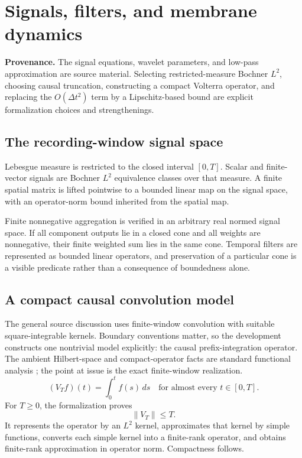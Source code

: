 \documentclass[11pt,a4paper]{article}
\begin{document}
\section{Signals, filters, and membrane dynamics}
\label{sec:signals}

\textbf{Provenance.} The signal equations, wavelet parameters, and low-pass
approximation are source material. Selecting restricted-measure Bochner
\(L^2\), choosing causal truncation, constructing a compact Volterra operator,
and replacing the \(O(\Delta t^2)\) term by a Lipschitz-based bound are explicit
formalization choices and strengthenings.

\subsection{The recording-window signal space}

Lebesgue measure is restricted to the closed interval \([0,T]\). Scalar and
finite-vector signals are Bochner \(L^2\) equivalence classes over that
measure. A finite spatial matrix is lifted pointwise to a bounded linear map
on the signal space, with an operator-norm bound inherited from the spatial
map.

Finite nonnegative aggregation is verified in an arbitrary real normed
signal space. If all component outputs lie in a closed cone and all weights
are nonnegative, their finite weighted sum lies in the same cone. Temporal
filters are represented as bounded linear operators, and preservation of a
particular cone is a visible predicate rather than a consequence of
boundedness alone.

\subsection{A compact causal convolution model}

The general source discussion uses finite-window convolution with suitable
square-integrable kernels. Boundary conventions matter, so the development
constructs one nontrivial model explicitly: the causal prefix-integration
operator. The ambient Hilbert-space and compact-operator facts are standard
functional analysis \cite{conway1990}; the point at issue is the exact
finite-window realization.
\[
  (V_Tf)(t)=\int_0^t f(s)\,ds
  \quad\text{for almost every }t\in[0,T].
\]
For \(T\geq0\), the formalization proves
\[
  \|V_T\|\leq T.
\]
It represents the operator by an \(L^2\) kernel, approximates that kernel by
simple functions, converts each simple kernel into a finite-rank operator,
and obtains finite-rank approximation in operator norm. Compactness follows.
\end{document}
